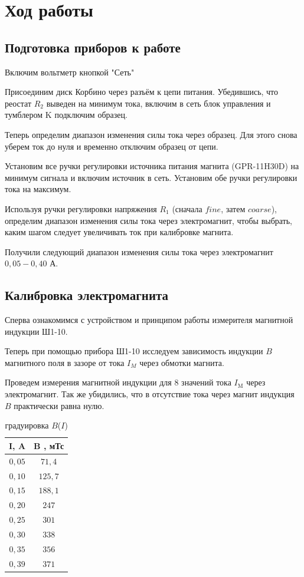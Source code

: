 \documentclass[a4paper, 12pt]{article}%
\begin{document}
\section{Ход работы}

\subsection{Подготовка приборов к работе}

Включим вольтметр кнопкой "Сеть"

Присоединим диск Корбино через разъём к цепи питания. Убедившись, что реостат $R_{2}$ выведен на минимум тока, включим в сеть блок управления и тумблером $\mathrm{K}$ подключим образец.

Теперь определим диапазон изменения силы тока через образец. Для этого снова уберем ток до нуля и временно отключим образец от цепи. 

Установим все ручки регулировки источника питания магнита (GPR-11H30D) на минимум сигнала и включим источник в сеть. Установим обе ручки регулировки тока на максимум.

Используя ручки регулировки напряжения $R_{1}$ (сначала $fine$, затем $coarse$), определим диапазон изменения силы тока через электромагнит, чтобы выбрать, каким шагом следует увеличивать ток при калибровке магнита. 

Получили следующий диапазон изменения силы тока через электромагнит $0,05 - 0,40$ А.


\subsection{Калибровка электромагнита}

Сперва ознакомимся с устройством и принципом работы измерителя магнитной индукции Ш1-10.

Теперь при помощью прибора Ш1-10 исследуем зависимость индукции $B$ магнитного поля в зазоре от тока $I_{M}$ через обмотки магнита.

Проведем измерения магнитной индукции для 8 значений тока $I_{\mathrm{M}}$ через электромагнит. Так же убидились, что в отсутствие тока через магнит индукция $B$ практически равна нулю.


\begin{table}[!h]
\begin{center}
\begin{tabular}{|c|c|}
\hline I, A & B , мТс	\\
\hline $0,05$ & $71,4$ 	\\
\hline $0,10$ & $125,7$ 	\\
\hline $0,15$ & $188,1$ 	\\
\hline $0,20$ & $247$ 	\\
\hline $0,25$ & $301$ 	\\
\hline $0,30$ & $338$ 	\\
\hline $0,35$ & $356$ 	\\
\hline $0,39$ & $371$ 	\\
\hline
\end{tabular}
\caption{градуировка $B$($I$)}
\end{center}
\end{table}
\end{document}
